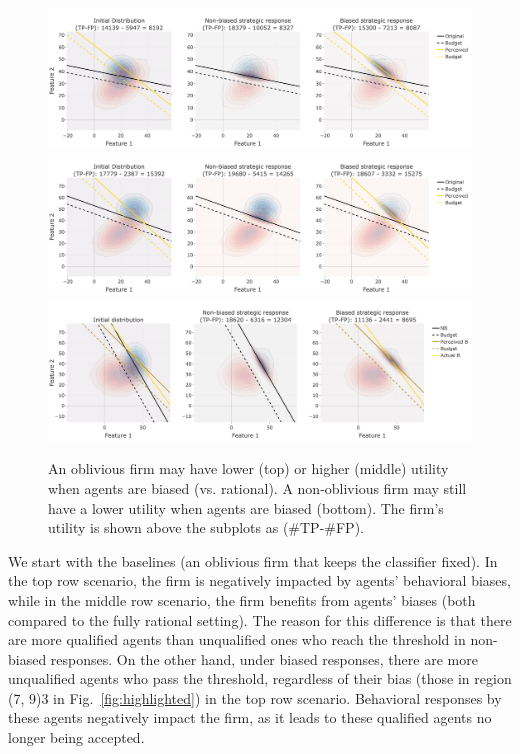 \begin{example}
\begin{figure}[t]
    \centering
    \includegraphics[width=0.9\linewidth]{Figures/1_all_three_GOATEDPLOT1_firm_gets_hurt.png}
    \includegraphics[width=0.9\linewidth]{Figures/1_all_three_GOATEDPLOT2_firm_benefits.png}
    \includegraphics[width=0.9\linewidth]{Figures/1_all_three_GOATEDPLOT_nonoblivious_firm.png}
    \caption{An oblivious firm may have lower (top) or higher (middle) utility when agents are biased (vs. rational). A non-oblivious firm may still have a lower utility when agents are biased (bottom). {The firm's utility is shown above the subplots as (\#TP-\#FP).}}
    \label{fig:firm-benefit-hurt-dist}
\end{figure}

We start with the baselines (an oblivious firm that keeps the classifier fixed). In the top row scenario, the firm is negatively impacted by agents' behavioral biases, while in the middle row scenario, the firm benefits from agents' biases (both compared to the fully rational setting). The reason for this difference is that there are more qualified agents than unqualified ones who reach the threshold in non-biased responses. On the other hand, under biased responses, there are more unqualified agents who pass the threshold, regardless of their bias (those in region \framebox(7, 9){3} in Fig.~\ref{fig:highlighted}) in the top row scenario. Behavioral responses by these agents negatively impact the firm, as it leads to these qualified agents no longer being accepted. 


\end{example}
